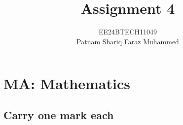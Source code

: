 \documentclass[journal]{IEEEtran}
\numberwithin{equation}{enumi}
\numberwithin{figure}{enumi}
\begin{document}


\title{Assignment 4}
\author{EE24BTECH11049 \\ Patnam Shariq Faraz Muhammed}

{\let\newpage\relax\maketitle}

\section{MA: Mathematics}
\subsection{Carry one mark each}
\end{document}
